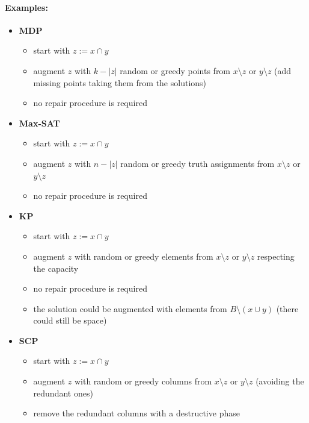 \paragraph{Examples:}
\begin{itemize}
	\item \textbf{MDP}
	\begin{itemize}
		\item start with $z := x \cap y$
		\item augment $z$ with $k - |z|$ random or greedy points from $x \setminus z$ or $y \setminus z$ (add missing points taking them from the solutions)
		\item no repair procedure is required
	\end{itemize}
	\nn
	
	\item \textbf{Max-SAT}
	\begin{itemize}
		\item start with $z := x \cap y$
		\item augment $z$ with $n - |z|$ random or greedy truth assignments from $x \setminus z$ or $y \setminus z$ 
		\item no repair procedure is required
	\end{itemize}
	\nn
	
	\item \textbf{KP}
	\begin{itemize}
		\item start with $z := x \cap y$
		\item augment $z$ with random or greedy elements from $x \setminus z$ or $y \setminus z$ respecting the capacity
		\item no repair procedure is required
		\item the solution could be augmented with elements from $B \setminus (x \cup y)$ (there could still be space)
	\end{itemize}
	\nn
	
	\item \textbf{SCP}
	\begin{itemize}
		\item start with $z := x \cap y$
		\item augment $z$ with random or greedy columns from $x \setminus z$ or $y \setminus z$ (avoiding the redundant ones)
		\item remove the redundant columns with a destructive phase
	\end{itemize}
	\nn
\end{itemize}

